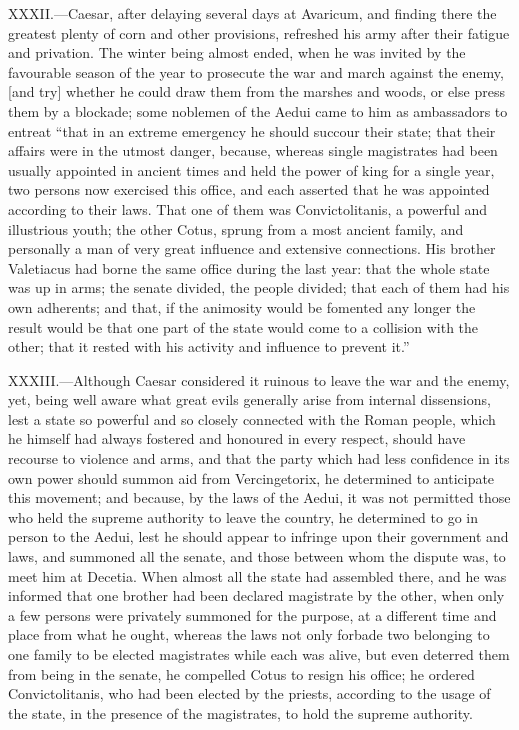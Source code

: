 XXXII.—Caesar, after delaying several days at Avaricum, and finding
there the greatest plenty of corn and other provisions, refreshed his
army after their fatigue and privation. The winter being almost ended,
when he was invited by the favourable season of the year to prosecute
the war and march against the enemy, [and try] whether he could draw
them from the marshes and woods, or else press them by a blockade; some
noblemen of the Aedui came to him as ambassadors to entreat ``that in an
extreme emergency he should succour their state; that their affairs were
in the utmost danger, because, whereas single magistrates had been
usually appointed in ancient times and held the power of king for a
single year, two persons now exercised this office, and each asserted
that he was appointed according to their laws. That one of them was
Convictolitanis, a powerful and illustrious youth; the other Cotus,
sprung from a most ancient family, and personally a man of very great
influence and extensive connections. His brother Valetiacus had borne
the same office during the last year: that the whole state was up in
arms; the senate divided, the people divided; that each of them had his
own adherents; and that, if the animosity would be fomented any longer
the result would be that one part of the state would come to a collision
with the other; that it rested with his activity and influence to
prevent it.''

XXXIII.—Although Caesar considered it ruinous to leave the war and the
enemy, yet, being well aware what great evils generally arise from
internal dissensions, lest a state so powerful and so closely connected
with the Roman people, which he himself had always fostered and honoured
in every respect, should have recourse to violence and arms, and that
the party which had less confidence in its own power should summon aid
from Vercingetorix, he determined to anticipate this movement; and
because, by the laws of the Aedui, it was not permitted those who held
the supreme authority to leave the country, he determined to go in
person to the Aedui, lest he should appear to infringe upon their
government and laws, and summoned all the senate, and those between whom
the dispute was, to meet him at Decetia. When almost all the state had
assembled there, and he was informed that one brother had been declared
magistrate by the other, when only a few persons were privately summoned
for the purpose, at a different time and place from what he ought,
whereas the laws not only forbade two belonging to one family to be
elected magistrates while each was alive, but even deterred them from
being in the senate, he compelled Cotus to resign his office; he ordered
Convictolitanis, who had been elected by the priests, according to the
usage of the state, in the presence of the magistrates, to hold the
supreme authority.

